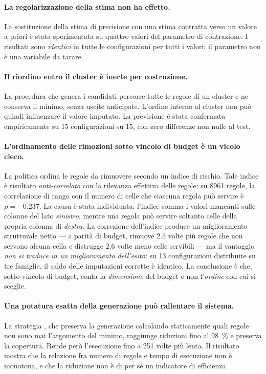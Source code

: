 \paragraph{La regolarizzazione della stima non ha effetto.} La sostituzione della stima di
precisione con una stima contratta verso un valore a priori è stata sperimentata su quattro
valori del parametro di contrazione. I risultati sono \emph{identici} in tutte le
configurazioni per tutti i valori: il parametro non è una variabile da tarare.

\paragraph{Il riordino entro il cluster è inerte per costruzione.} La procedura che genera i
candidati percorre tutte le regole di un cluster e ne conserva il minimo, senza uscite
anticipate. L'ordine interno al cluster non può quindi influenzare il valore imputato. La
previsione è stata confermata empiricamente su \num{15} configurazioni su \num{15}, con zero
differenze non nulle al test.

\paragraph{L'ordinamento delle rimozioni sotto vincolo di budget è un vicolo cieco.} La politica
 ordina le regole da rimuovere secondo un indice di rischio. Tale indice è risultato
\emph{anti-correlato} con la rilevanza effettiva delle regole: su \num{8961} regole, la
correlazione di rango con il numero di celle che ciascuna regola può servire è $\rho = -0.237$.
La causa è stata individuata: l'indice somma i valori mancanti sulle colonne del lato
\emph{sinistro}, mentre una regola può servire soltanto celle della propria colonna di
\emph{destra}. La correzione dell'indice produce un miglioramento strutturale netto --- a parità
di budget, rimuove $2.5$ volte più regole che non servono alcuna cella e distrugge $2.6$ volte
meno celle servibili --- ma il vantaggio \emph{non si traduce in un miglioramento dell'esito}:
su \num{13} configurazioni distribuite su tre famiglie, il saldo delle imputazioni corrette è
identico. La conclusione è che, sotto vincolo di budget, conta la \emph{dimensione} del budget e
non l'\emph{ordine} con cui si sceglie.

\paragraph{Una potatura esatta della generazione può rallentare il sistema.} La strategia
, che preserva la generazione calcolando staticamente quali regole non sono mai
l'argomento del minimo, raggiunge riduzioni fino al \SI{98}{\percent} e preserva la copertura.
Rende però l'esecuzione fino a \num{251} volte più lenta. Il risultato mostra che la relazione fra
numero di regole e tempo di esecuzione non è monotona, e che la riduzione non è di per sé un
indicatore di efficienza.

